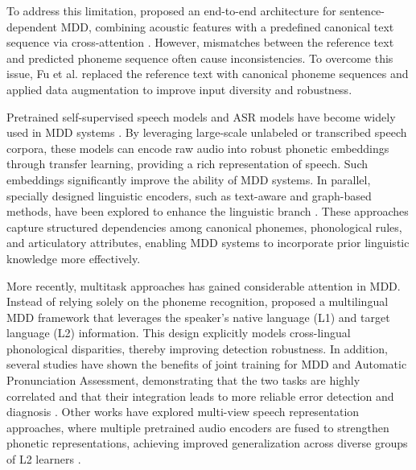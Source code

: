 \documentclass{article}
\begin{document}
To address this limitation, \cite{sed-mdd} proposed an end-to-end architecture for sentence-dependent MDD, combining acoustic features with a predefined canonical text sequence via cross-attention \cite{attn}. However, mismatches between the reference text and predicted phoneme sequence often cause inconsistencies. To overcome this issue, Fu et al. \cite{AFullText-Dependent} replaced the reference text with canonical phoneme sequences and applied data augmentation to improve input diversity and robustness.
 
Pretrained self-supervised speech models and ASR models have become widely used in MDD systems \cite{APL,related_peng21e_interspeech}. By leveraging large-scale unlabeled or transcribed speech corpora, these models can encode raw audio into robust phonetic embeddings through transfer learning, providing a rich representation of speech. Such embeddings significantly improve the ability of MDD systems. In parallel, specially designed linguistic encoders, such as text-aware and graph-based methods, have been explored to enhance the linguistic branch \cite{gcnmdd, text-aware}. These approaches capture structured dependencies among canonical phonemes, phonological rules, and articulatory attributes, enabling MDD systems to incorporate prior linguistic knowledge more effectively.

More recently, multitask approaches has gained considerable attention in MDD. Instead of relying solely on the phoneme recognition, \cite{multilingualmdd} proposed a multilingual MDD framework that leverages the speaker’s native language (L1) and target language (L2) information. This design explicitly models cross-lingual phonological disparities, thereby improving detection robustness. In addition, several studies have shown the benefits of joint training for MDD and Automatic Pronunciation Assessment, demonstrating that the two tasks are highly correlated and that their integration leads to more reliable error detection and diagnosis \cite{join_mdd_apa}. Other works have explored multi-view speech representation approaches, where multiple pretrained audio encoders are fused to strengthen phonetic representations, achieving improved generalization across diverse groups of L2 learners \cite{multiview}.
\end{document}
